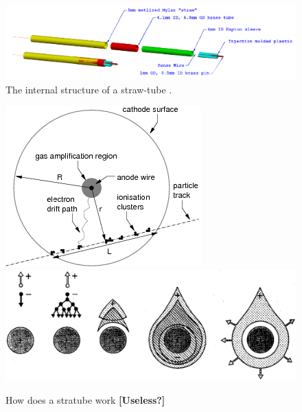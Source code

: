 \documentclass[12pt,a4paper,openright, oneside, titlepage]{book} %
\begin{document}
\begin{figure}[h!]
\centering
\includegraphics[scale=0.4]{straw}
\caption[Structure of a straw-tube]{The internal structure of a straw-tube \cite{MTDR}.}
\label{_straw}
\end{figure}

\begin{figure}[h!]
\centering
\includegraphics[scale=0.5]{straw_avalanche}
\includegraphics[scale=0.4]{straw_avalanche_2}
\caption[Avalanche process in straw-tube]{How does a stratube work \cite{MultiwireDrift} \textbf{[Useless?]}}
\label{_straw_avalanche}
\end{figure}
\end{document}
